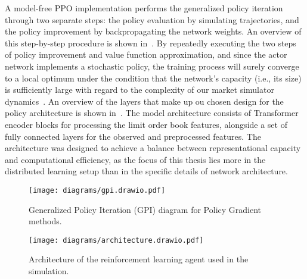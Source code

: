 \documentclass[11pt]{article}
\begin{document}
    A model-free PPO implementation performs the generalized policy iteration through two separate steps: 
    the policy evaluation by simulating trajectories, and the policy improvement by backpropagating the network weights.
    An overview of this step-by-step procedure is shown in~.
    By repeatedly executing the two steps of policy improvement and value function approximation, 
    and since the actor network implements a stochastic policy, 
    the training process will surely converge to a local optimum under the condition that the network's capacity 
    (i.e., its size) is sufficiently large with regard to the complexity of our market simulator dynamics~\citep{Sutton2000, Schulman2015}.
    An overview of the layers that make up ou chosen design for the policy architecture is shown in~.
    The model architecture consists of Transformer encoder blocks for processing the limit order book features, 
    alongside a set of fully connected layers for the observed and preprocessed features. 
    The architecture was designed to achieve a balance between representational capacity and computational efficiency, 
    as the focus of this thesis lies more in the distributed learning setup than in the specific details of network architecture.

    \begin{figure}[htb]
        \centering
        \texttt{[image: diagrams/gpi.drawio.pdf]}
        \caption{Generalized Policy Iteration (GPI) diagram for Policy Gradient methods.}
        \label{fig:gpi}
    \end{figure}

    \begin{figure}[htb]
        \centering
        \texttt{[image: diagrams/architecture.drawio.pdf]}
        \caption{Architecture of the reinforcement learning agent used in the simulation.}
        \label{fig:architecture}
    \end{figure}
\end{document}
